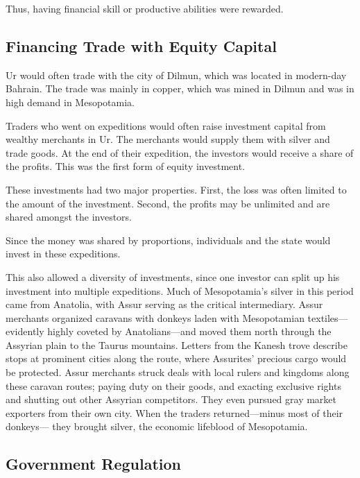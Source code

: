 \documentclass{article}
\begin{document}
    Thus, having financial skill or productive abilities were rewarded. 

  \subsection{Financing Trade with Equity Capital}

    Ur would often trade with the city of Dilmun, which was located in modern-day Bahrain. The trade was mainly in copper, which was mined in Dilmun and was in high demand in Mesopotamia. 

    \begin{finance}
      Traders who went on expeditions would often raise investment capital from wealthy merchants in Ur. The merchants would supply them with silver and trade goods. At the end of their expedition, the investors would receive a share of the profits. This was the first form of equity investment.
    \end{finance}

    These investments had two major properties. First, the loss was often limited to the amount of the investment. Second, the profits may be unlimited and are shared amongst the investors. 

    Since the money was shared by proportions, individuals and the state would invest in these expeditions. 

    This also allowed a diversity of investments, since one investor can split up his investment into multiple expeditions. Much of Mesopotamia’s silver in this period came from Anatolia, with Assur serving as the critical intermediary. Assur merchants organized caravans with donkeys laden with Mesopotamian textiles—evidently highly coveted by Anatolians—and moved them north through the Assyrian plain to the Taurus mountains. Letters from the Kanesh trove describe stops at prominent cities along the route, where Assurites’ precious cargo would be protected. Assur merchants struck deals with local rulers and kingdoms along these caravan routes; paying duty on their goods, and exacting exclusive rights and shutting out other Assyrian competitors. They even pursued gray market exporters from their own city. When the traders returned—minus most of their donkeys— they brought silver, the economic lifeblood of Mesopotamia.

  \subsection{Government Regulation}
\end{document}
